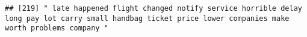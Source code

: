 \documentclass[
]{article}
\begin{document}
\begin{verbatim}
## [219] " late happened flight changed notify service horrible delay long pay lot carry small handbag ticket price lower companies make worth problems company "                                                                                                                                                                                                                                                                                                                                                                                                                                                                                                                                                                                                                                                                                                                                                                                                                                                                                                                                                                                                                                                                                                                                                                                                                                                                                                                                                                                                                                                                                                                                                                                                                                        

\end{verbatim}
\end{document}
